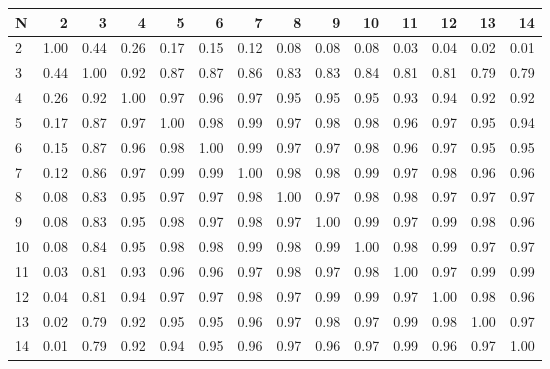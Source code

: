 \begin{tabular}{lrrrrrrrrrrrrr}
\toprule
N &    2  &    3  &    4  &    5  &    6  &    7  &    8  &    9  &    10 &    11 &    12 &    13 &    14 \\
\midrule
2  &  1.00 &  0.44 &  0.26 &  0.17 &  0.15 &  0.12 &  0.08 &  0.08 &  0.08 &  0.03 &  0.04 &  0.02 &  0.01 \\
3  &  0.44 &  1.00 &  0.92 &  0.87 &  0.87 &  0.86 &  0.83 &  0.83 &  0.84 &  0.81 &  0.81 &  0.79 &  0.79 \\
4  &  0.26 &  0.92 &  1.00 &  0.97 &  0.96 &  0.97 &  0.95 &  0.95 &  0.95 &  0.93 &  0.94 &  0.92 &  0.92 \\
5  &  0.17 &  0.87 &  0.97 &  1.00 &  0.98 &  0.99 &  0.97 &  0.98 &  0.98 &  0.96 &  0.97 &  0.95 &  0.94 \\
6  &  0.15 &  0.87 &  0.96 &  0.98 &  1.00 &  0.99 &  0.97 &  0.97 &  0.98 &  0.96 &  0.97 &  0.95 &  0.95 \\
7  &  0.12 &  0.86 &  0.97 &  0.99 &  0.99 &  1.00 &  0.98 &  0.98 &  0.99 &  0.97 &  0.98 &  0.96 &  0.96 \\
8  &  0.08 &  0.83 &  0.95 &  0.97 &  0.97 &  0.98 &  1.00 &  0.97 &  0.98 &  0.98 &  0.97 &  0.97 &  0.97 \\
9  &  0.08 &  0.83 &  0.95 &  0.98 &  0.97 &  0.98 &  0.97 &  1.00 &  0.99 &  0.97 &  0.99 &  0.98 &  0.96 \\
10 &  0.08 &  0.84 &  0.95 &  0.98 &  0.98 &  0.99 &  0.98 &  0.99 &  1.00 &  0.98 &  0.99 &  0.97 &  0.97 \\
11 &  0.03 &  0.81 &  0.93 &  0.96 &  0.96 &  0.97 &  0.98 &  0.97 &  0.98 &  1.00 &  0.97 &  0.99 &  0.99 \\
12 &  0.04 &  0.81 &  0.94 &  0.97 &  0.97 &  0.98 &  0.97 &  0.99 &  0.99 &  0.97 &  1.00 &  0.98 &  0.96 \\
13 &  0.02 &  0.79 &  0.92 &  0.95 &  0.95 &  0.96 &  0.97 &  0.98 &  0.97 &  0.99 &  0.98 &  1.00 &  0.97 \\
14 &  0.01 &  0.79 &  0.92 &  0.94 &  0.95 &  0.96 &  0.97 &  0.96 &  0.97 &  0.99 &  0.96 &  0.97 &  1.00 \\
\bottomrule
\end{tabular}
